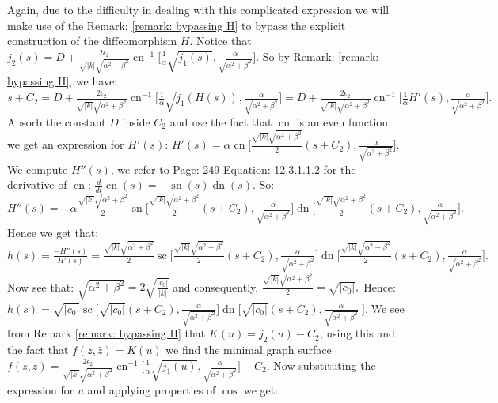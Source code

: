 \documentclass[12pt]{article}
\theoremstyle{plain}
\theoremstyle{definition}
\theoremstyle{remark}
\begin{document}
  Again, due to the difficulty in dealing with this complicated expression we will make use of the Remark: \ref{remark: bypassing H} to bypass the explicit construction of the diffeomorphism \(H\). Notice that \footnotesize\(j_2(s)=D+\tfrac{2\epsilon_2}{\sqrt{|k|}\sqrt{\alpha^2+\beta^2}}\operatorname{cn}^{-1}\Big[\tfrac{1}{\alpha}\sqrt{j_1(s)},\tfrac{\alpha}{\sqrt{\alpha^2+\beta^2}}\Big]\)\normalsize. So by Remark: \ref{remark: bypassing H}, we have: \footnotesize\(s+C_2=D+\tfrac{2\epsilon_2}{\sqrt{|k|}\sqrt{\alpha^2+\beta^2}}\operatorname{cn}^{-1}\Big[\tfrac{1}{\alpha}\sqrt{j_1(H(s))},\tfrac{\alpha}{\sqrt{\alpha^2+\beta^2}}\Big]=D+\tfrac{2\epsilon_2}{\sqrt{|k|}\sqrt{\alpha^2+\beta^2}}\operatorname{cn}^{-1}\Big[\tfrac{1}{\alpha}H'(s),\tfrac{\alpha}{\sqrt{\alpha^2+\beta^2}}\Big].\;\)\normalsize Absorb the constant \(D\) inside \(C_2\) and use the fact that \(\operatorname{cn}\) is an even function, we get an expression for \(H'(s)\): \footnotesize\(H'(s)=\alpha\operatorname{cn}\big[\tfrac{\sqrt{|k|}\sqrt{\alpha^2+\beta^2}}{2}(s+C_2),\tfrac{\alpha}{\sqrt{\alpha^2+\beta^2}}\big].\;\)\normalsize We compute \(H''(s)\), we refer to \cite{JD} Page: 249 Equation: 12.3.1.1.2 for the derivative of \(\operatorname{cn}\): \(\tfrac{d}{dt}\operatorname{cn}(s)=-\operatorname{sn}(s)\operatorname{dn}(s)\). So: \footnotesize\(H''(s)=-\alpha\tfrac{\sqrt{|k|}\sqrt{\alpha^2+\beta^2}}{2}\operatorname{sn}\big[\tfrac{\sqrt{|k|}\sqrt{\alpha^2+\beta^2}}{2}(s+C_2),\tfrac{\alpha}{\sqrt{\alpha^2+\beta^2}}\big]\operatorname{dn}\big[\tfrac{\sqrt{|k|}\sqrt{\alpha^2+\beta^2}}{2}(s+C_2),\tfrac{\alpha}{\sqrt{\alpha^2+\beta^2}}\big].\;\)\normalsize Hence we get that: \footnotesize\(h(s)=\tfrac{-H''(s)}{H'(s)}=\tfrac{\sqrt{|k|}\sqrt{\alpha^2+\beta^2}}{2}\operatorname{sc}\big[\tfrac{\sqrt{|k|}\sqrt{\alpha^2+\beta^2}}{2}(s+C_2),\tfrac{\alpha}{\sqrt{\alpha^2+\beta^2}}\big]\operatorname{dn}\big[\tfrac{\sqrt{|k|}\sqrt{\alpha^2+\beta^2}}{2}(s+C_2),\tfrac{\alpha}{\sqrt{\alpha^2+\beta^2}}\big].\;\)\normalsize Now see that: \footnotesize\(\sqrt{\alpha^2+\beta^2}=2\sqrt{\tfrac{|c_0|}{|k|}}\;\)\normalsize and consequently, \footnotesize\(\tfrac{\sqrt{|k|}\sqrt{\alpha^2+\beta^2}}{2}=\sqrt{|c_0|},\;\)\normalsize Hence: \footnotesize\(h(s)=\sqrt{|c_0|}\operatorname{sc}\big[\sqrt{|c_0|}(s+C_2),\tfrac{\alpha}{\sqrt{\alpha^2+\beta^2}}\big]\operatorname{dn}\big[\sqrt{|c_0|}(s+C_2),\tfrac{\alpha}{\sqrt{\alpha^2+\beta^2}}\;\big].\;\)\normalsize We see from Remark \ref{remark: bypassing H} that \footnotesize\(K(u)=j_2(u)-C_2\)\normalsize, using this and the fact that \(f(z,\bar z)=K(u)\) we find the minimal graph surface \footnotesize\(f(z,\bar z)=\tfrac{2\epsilon_2}{\sqrt{|k|}\sqrt{\alpha^2+\beta^2}}\operatorname{cn}^{-1}\Big[\tfrac{1}{\alpha}\sqrt{j_1(u)},\tfrac{\alpha}{\sqrt{\alpha^2+\beta^2}}\Big]-C_2\)\normalsize. Now substituting the expression for \(u\) and applying properties of \(\cos\) we get:
  
\end{document}
